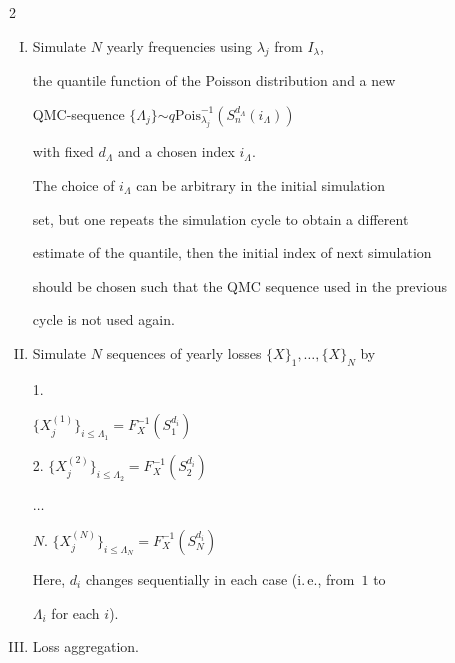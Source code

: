 \begin{multicols}{2}
\begin{enumerate}[I.]
frequency parameter $\lambda$ by

$I_\lambda=F_{\lambda}^{-1}\left(S^{d_{\lambda}}_n(i_1)\right)$

likewise.

\item Simulate $N$ yearly frequencies using $\lambda_j$ from $I_\lambda$,

the quantile function of the Poisson distribution and a new

QMC-sequence $\{\Lambda_j\}$\linebreak $\sim

q\mathrm{Pois}_{\lambda_j}^{-1}\left(S^{d_{\Lambda}}_n(i_\Lambda)\right)$

with fixed $d_{\Lambda}$ and a chosen index $i_\Lambda$. \par



The choice of $i_\Lambda$ can be arbitrary in the initial simulation

set, but one repeats the simulation cycle to obtain a different

estimate of the quantile, then the initial index of next simulation

should be chosen such that the QMC sequence used in the previous

cycle is not used again.

\item Simulate $N$ sequences of yearly losses $\{X\}_1,\dots,\{X\}_N$ by

\par 1.

$\{X^{(1)}_j\}_{i\leq \Lambda_1} =

F_{X}^{-1}\left(S^{d_{i}}_1\right)$\par 2. $\{X^{(2)}_j\}_{i\leq

\Lambda_2} = F_{X}^{-1}\left(S^{d_{i}}_2\right)$

\par $\dots$\par

$N$. $\{X^{(N)}_j\}_{i\leq \Lambda_N} =

F_{X}^{-1}\left(S^{d_{i}}_N\right)$\par



Here, $d_i$ changes sequentially in each case (i.\,e., from~$1$ to

$\Lambda_i$ for each $i$).

\item Loss aggregation.




\end{enumerate}
\end{multicols}

